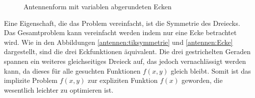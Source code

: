 \begin{figure}
\begin{minipage}[t]{0.45\textwidth}
		\caption{Antennenform mit variablen abgerundeten Ecken}
		\label{antennen:tikabgerundet_kleiner}
	\end{minipage}%
\end{figure}
\FloatBarrier
Eine Eigenschaft, die das Problem vereinfacht, ist die Symmetrie des Dreiecks. 
Das Gesamtproblem kann vereinfacht werden indem nur eine Ecke betrachtet wird. 
Wie in den Abbildungen \ref{antennen:tiksymmetrie} und \ref{antennen:Ecke} dargestellt, sind die drei Eckfunktionen äquivalent. Die drei 
gestrichelten Geraden spannen ein weiteres gleichseitiges Dreieck auf, das 
jedoch vernachlässigt werden kann, da dieses für alle gesuchten Funktionen $f(x,y)$ 
gleich bleibt. Somit ist das implizite Problem $f(x,y)$ zur expliziten Funktion $f(x)$ 
geworden, die wesentlich leichter zu optimieren ist.
